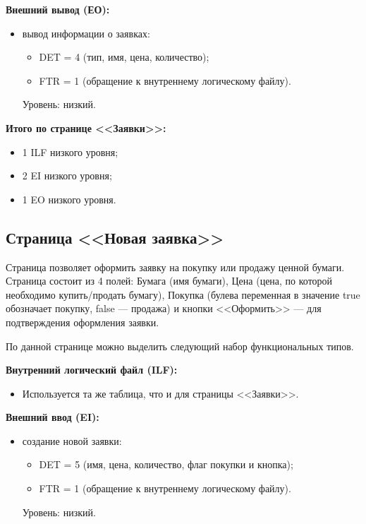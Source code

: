 \documentclass{bmstu}
\begin{document}
\textbf{Внешний вывод (ЕО):}

\begin{itemize}
    \item вывод информации о заявках:
    \begin{itemize}
        \item DET = 4 (тип, имя, цена, количество);
        \item FTR = 1 (обращение к внутреннему логическому файлу).
    \end{itemize}
    Уровень: низкий.
\end{itemize}

\textbf{Итого по странице <<Заявки>>:}

\begin{itemize}
    \item 1 ILF низкого уровня;
    \item 2 EI низкого уровня;
    \item 1 EO низкого уровня.
\end{itemize}

\clearpage

\subsection*{Страница <<Новая заявка>>}


Страница позволяет оформить заявку на покупку или продажу ценной бумаги. Страница состоит из 4 полей: Бумага (имя бумаги), Цена (цена, по которой необходимо купить/продать бумагу), Покупка (булева переменная в значение true обозначает покупку, false --- продажа) и кнопки <<Оформить>> --- для подтверждения оформления заявки.

По данной странице можно выделить следующий набор функциональных типов.


\textbf{Внутренний логический файл (ILF):}

\begin{itemize}
    \item Используется та же таблица, что и для страницы <<Заявки>>.
\end{itemize}

\textbf{Внешний ввод (EI):}

\begin{itemize}
    \item создание новой заявки:
    \begin{itemize}
        \item DET = 5 (имя, цена, количество, флаг покупки и кнопка);
        \item FTR = 1 (обращение к внутреннему логическому файлу).
    \end{itemize}
    Уровень: низкий.
\end{itemize}
\end{document}
